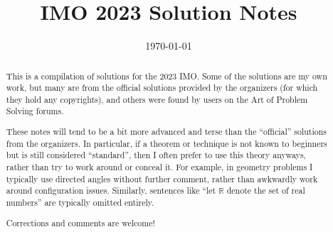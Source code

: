 \documentclass[11pt]{scrartcl}
\title{IMO 2023 Solution Notes}
\date{\today}
\begin{document}
\maketitle

\begin{abstract}
This is a compilation of solutions
for the 2023 IMO.
Some of the solutions are my own work,
but many are from the official solutions provided by the organizers
(for which they hold any copyrights),
and others were found by users on the Art of Problem Solving forums.

These notes will tend to be a bit more advanced and terse than the ``official''
solutions from the organizers.
In particular, if a theorem or technique is not known to beginners
but is still considered ``standard'', then I often prefer to
use this theory anyways, rather than try to work around or conceal it.
For example, in geometry problems I typically use directed angles
without further comment, rather than awkwardly work around configuration issues.
Similarly, sentences like ``let $\mathbb{R}$ denote the set of real numbers''
are typically omitted entirely.

Corrections and comments are welcome!
\end{abstract}

\tableofcontents
\newpage

\addtocounter{section}{-1}
\end{document}
